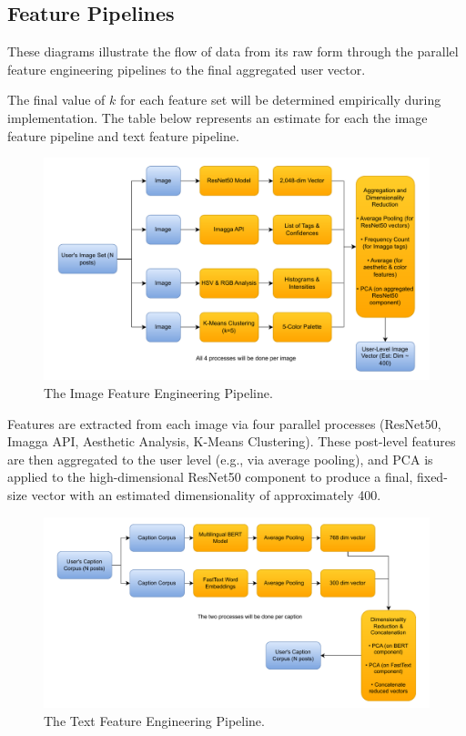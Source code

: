 \subsection{Feature Pipelines}
These diagrams illustrate the flow of data from its raw form through the parallel feature engineering pipelines to the final aggregated user vector. 

The final value of $k$ for each feature set will be determined empirically during implementation. The table below represents an estimate for each the image feature pipeline and text feature pipeline.


\begin{figure}[H]
	\centering
	\includegraphics[width=\textwidth]{"figures/Image-Pipeline-Diagram.pdf"}
	\caption{The Image Feature Engineering Pipeline. }
	\label{fig:image_pipeline_diagram}
\end{figure}

Features are extracted from each image via four parallel processes (ResNet50, Imagga API, Aesthetic Analysis, K-Means Clustering). These post-level features are then aggregated to the user level (e.g., via average pooling), and PCA is applied to the high-dimensional ResNet50 component to produce a final, fixed-size vector with an estimated dimensionality of approximately 400.

\begin{figure}[H]
	\centering
	\includegraphics[width=\textwidth]{"figures/Text-Pipeline-Diagram.pdf"}
	\caption{The Text Feature Engineering Pipeline. }
	\label{fig:text_pipeline_diagram}
\end{figure}

